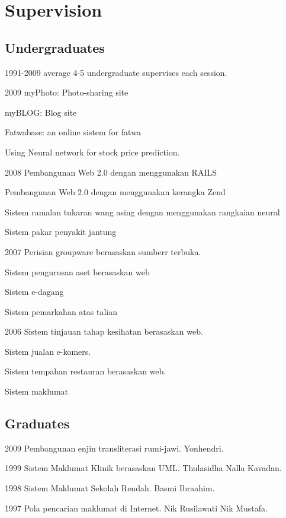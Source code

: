 \documentclass[a4paper]{article}
\begin{document}
\section{Supervision}
\subsection*{Undergraduates}

\begin{CV}
\item[1991-2009] average 4-5 undergraduate supervises each session.
\item [2009] myPhoto: Photo-sharing site
\item        myBLOG: Blog site
\item        Fatwabase: an online sistem for fatwa
\item        Using Neural network for stock price prediction.
\item[2008] Pembangunan Web 2.0 dengan menggunakan RAILS
\item Pembangunan Web 2.0 dengan menggunakan kerangka Zend
\item Sistem ramalan tukaran wang asing dengan menggunakan rangkaian neural
\item Sistem pakar penyakit jantung 
\item[2007] Perisian groupware berasaskan sumberr terbuka.
\item Sistem pengurusan aset berasaskan web
\item Sistem e-dagang
\item Sistem pemarkahan atas talian
\item[2006] Sistem tinjauan tahap kesihatan berasaskan web.
\item Sistem jualan e-komers.
\item Sistem tempahan restauran berasaskan web.
\item Sistem maklumat 
\end{CV}
\subsection*{Graduates}

\begin{CV}
\item[2009] Pembangunan enjin transliterasi rumi-jawi. Yonhendri.
\item[1999] Sistem Maklumat Klinik berasaskan UML. Thulasidha Nalla Kavadan.
\item[1998] Sistem Maklumat Sekolah Rendah. Basmi Ibraahim.
\item[1997] Pola pencarian maklumat di Internet. Nik Rusilawati Nik Mustafa.
\end{CV}
\end{document}

